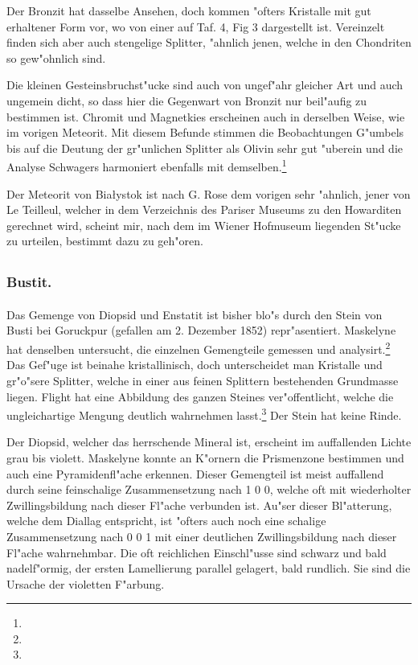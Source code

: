 \documentclass[a4paper, 11pt, oneside, polutonikogreek, german]{article}
\begin{document}
Der Bronzit hat dasselbe Ansehen, doch kommen "ofters Kristalle mit gut erhaltener Form vor, wo von einer auf Taf. 4, Fig 3 dargestellt ist. Vereinzelt finden sich aber auch stengelige Splitter, "ahnlich jenen, welche in den Chondriten so gew"ohnlich sind.

Die kleinen Gesteinsbruchst"ucke sind auch von ungef"ahr gleicher Art und auch ungemein dicht, so dass hier die Gegenwart von Bronzit nur beil"aufig zu bestimmen ist. Chromit und Magnetkies erscheinen auch in derselben Weise, wie im vorigen Meteorit. Mit diesem Befunde stimmen die Beobachtungen G"umbels bis auf die Deutung der gr"unlichen Splitter als Olivin sehr gut "uberein und die Analyse Schwagers harmoniert ebenfalls mit demselben.\footnote{}

Der Meteorit von Białystok ist nach G. Rose dem vorigen sehr "ahnlich, jener von Le Teilleul, welcher in dem Verzeichnis des Pariser Museums zu den Howarditen gerechnet wird, scheint mir, nach dem im Wiener Hofmuseum liegenden St"ucke zu urteilen, bestimmt dazu zu geh"oren.
\clearpage
\subsection{}
\subsubsection{Bustit.}
\paragraph{}
Das Gemenge von Diopsid und Enstatit ist bisher blo"s durch den Stein von Busti bei Goruckpur (gefallen am 2. Dezember 1852) repr"asentiert. Maskelyne hat denselben untersucht, die einzelnen Gemengteile gemessen und analysirt.\footnote{} Das Gef"uge ist beinahe kristallinisch, doch unterscheidet man Kristalle und gr"o"sere Splitter, welche in einer aus feinen Splittern bestehenden Grundmasse liegen. Flight hat eine Abbildung des ganzen Steines ver"offentlicht, welche die ungleichartige Mengung deutlich wahrnehmen lasst.\footnote{} Der Stein hat keine Rinde.

Der Diopsid, welcher das herrschende Mineral ist, erscheint im auffallenden Lichte grau bis violett. Maskelyne konnte an K"ornern die Prismenzone bestimmen und auch eine Pyramidenfl"ache erkennen. Dieser Gemengteil ist meist auffallend durch seine feinschalige Zusammensetzung nach 1 0 0, welche oft mit wiederholter Zwillingsbildung nach dieser Fl"ache verbunden ist. Au"ser dieser Bl"atterung, welche dem Diallag entspricht, ist "ofters auch noch eine schalige Zusammensetzung nach 0 0 1 mit einer deutlichen Zwillingsbildung nach dieser Fl"ache wahrnehmbar. Die oft reichlichen Einschl"usse sind schwarz und bald nadelf"ormig, der ersten Lamellierung parallel gelagert, bald rundlich. Sie sind die Ursache der violetten F"arbung.
\end{document}
